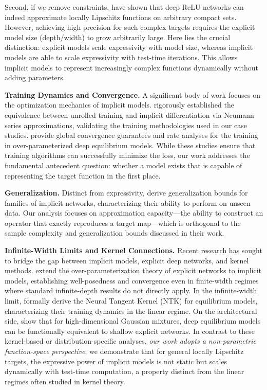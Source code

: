 \documentclass{amsart} %
\theoremstyle{definition}
\theoremstyle{remark}
\begin{document}
Second, if we remove constraints, \cite{beneventano2021deep} have shown that deep ReLU networks can indeed approximate locally Lipschitz functions on arbitrary compact sets. However, achieving high precision for such complex targets requires the explicit model size (depth/width) to grow arbitrarily large. Here lies the crucial distinction: explicit models scale expressivity with model size, whereas implicit models are able to scale expressivity with test-time iterations. This allows implicit models to represent increasingly complex functions dynamically without adding parameters.

\textbf{Training Dynamics and Convergence.} A significant body of work focuses on the optimization mechanics of implicit models. \cite{geng2021training} rigorously established the equivalence between unrolled training and implicit differentiation via Neumann series approximations, validating the training methodologies used in our case studies. \cite{ling2023global,truong2025global} provide global convergence guarantees and rate analyses for the training in over-parameterized deep equilibrium models. While these studies ensure that training algorithms can successfully minimize the loss, our work addresses the fundamental antecedent question: whether a model exists that is capable of representing the target function in the first place.

\textbf{Generalization.} Distinct from expressivity, \cite{fung2024generalization} derive generalization bounds for families of implicit networks, characterizing their ability to perform on unseen data. Our analysis focuses on approximation capacity—the ability to construct an operator that exactly reproduces a target map—which is orthogonal to the sample complexity and generalization bounds discussed in their work.

\textbf{Infinite-Width Limits and Kernel Connections.} Recent research has sought to bridge the gap between implicit models, explicit deep networks, and kernel methods. \cite{gao2022a} extend the over-parameterization theory of explicit networks to implicit models, establishing well-posedness and convergence even in finite-width regimes where standard infinite-depth results do not directly apply. In the infinite-width limit, \cite{feng2023neural} formally derive the Neural Tangent Kernel (NTK) for equilibrium models, characterizing their training dynamics in the linear regime. On the architectural side, \cite{ling2024deep} show that for high-dimensional Gaussian mixtures, deep equilibrium models can be functionally equivalent to shallow explicit networks. In contrast to these kernel-based or distribution-specific analyses, \textit{our work adopts a non-parametric function-space perspective}; we demonstrate that for general locally Lipschitz targets, the expressive power of implicit models is not static but scales dynamically with test-time computation, a property distinct from the linear regimes often studied in kernel theory.
\end{document}
